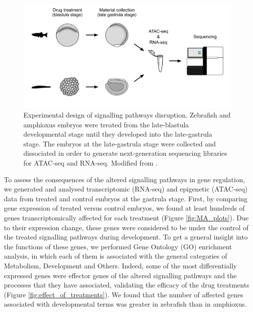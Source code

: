 \begin{figure}[hbtp]
\centering
\includegraphics[width=1\textwidth]{Figures/squeme_drug_treatment}
\caption[Drug treatment scheme]{ Experimental design of signalling pathways disruption. Zebrafish and amphioxus embryos were treated from the late-blastula developmental stage until they developed into the late-gastrula stage. The embryos at the late-gastrula stage were collected and dissociated in order to generate next-generation sequencing libraries for ATAC-seq and RNA-seq. Modified from \parencite{gil-galvez_gain_2022}.
}
\label{fig:drug_squeme}
\end{figure} 




 To assess the consequences of the altered signalling pathways in gene regulation, we generated and analysed transcriptomic (RNA-seq) and epigenetic (ATAC-seq) data from treated and control embryos at the gastrula stage. First, by comparing gene expression of treated versus control embryos, we found at least hundreds of genes transcriptomically affected for each treatment (Figure \ref{fig:MA_plots}). Due to their expression change, these genes were considered to be under the control of the treated signalling pathways during development. To get a general insight into the functions of these genes, we performed Gene Ontology (GO) enrichment analysis, in which each of them is associated with the general categories of  Metabolism, Development and Others. Indeed, some of the most differentially expressed genes were effector genes of the altered signalling pathways and the processes that they have associated, validating the efficacy of the drug treatments (Figure \ref{fig:effect_of_treatments}). We found that the number of affected genes associated with developmental terms was greater in zebrafish than in amphioxus.
 
